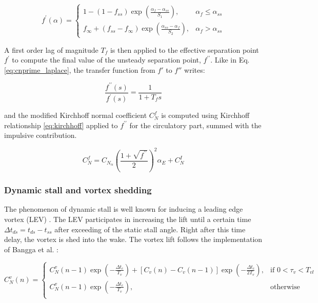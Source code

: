 \begin{equation}
f^{\prime}(\alpha)=\left\{\begin{array}{ll}
1-(1-f_{ss}) \exp \left(\frac{\alpha_{f}-\alpha_{ss}}{S_{1}}\right), & \alpha_{f} \leq \alpha_{ss} \\
f_\infty + (f_{ss}-f_\infty) \exp \left(\frac{\alpha_{ss}-\alpha_{f}}{S_{2}}\right), & \alpha_{f}>\alpha_{ss}
\end{array}\right.
\end{equation}

A first order lag of magnitude $T_f$ is then applied to the effective separation point $f^{\prime}$ to compute the final value of the unsteady separation point, $f^{\prime \prime}$. Like in Eq. \eqref{eq:cnprime_laplace}, the transfer function from $f'$ to $f''$ writes:

\begin{equation}
\frac{f^{\prime \prime}(s)}{f^{\prime} (s)} = \frac{1}{1 + T_f s}
\end{equation}

\noindent and the modified Kirchhoff normal coefficient $C_N^f$ is computed using Kirchhoff relationship \eqref{eq:kirchhoff} applied to $f^{\prime \prime}$ for the circulatory part, summed with the impulsive contribution.

\begin{equation}
	C_{N}^{f}=C_{N_{\alpha}}\left(\frac{1+\sqrt{f^{\prime \prime}}}{2}\right)^{2} \alpha_{E}+C_{N}^{I}
	\label{eq:mod_kirchhoff}
\end{equation}

\subsubsection{Dynamic stall and vortex shedding}

The phenomenon of dynamic stall is well known for inducing a leading edge vortex (LEV) \cite{mccroskey_dynamic_1976,mulleners_onset_2010,mulleners_dynamic_2013}. The LEV participates in increasing the lift until a certain time $\Delta t_{ds}=t_{ds}-t_{ss}$ after exceeding of the static stall angle. Right after this time delay, the vortex is shed into the wake. The vortex lift follows the implementation of Bangga et al. \cite{bangga_improved_2020}:

\begin{equation}
	C_{N}^{v}(n)=
	\begin{cases}
		C_{N}^{v}(n-1) \exp \left(-\frac{\Delta t_c}{T_{v}}\right)+\left[C_{v}(n)-C_{v}(n-1)\right] \exp \left(-\frac{\Delta t_c}{2 T_{v}}\right), & \text{if } 0<\tau_v<T_{vl} \\
		C_{N}^{v}(n-1) \exp \left(-\frac{\Delta t_c}{T_{v}}\right), & \text{otherwise} \\
	\end{cases}	
	\label{eq:vortex_lift}
\end{equation}

